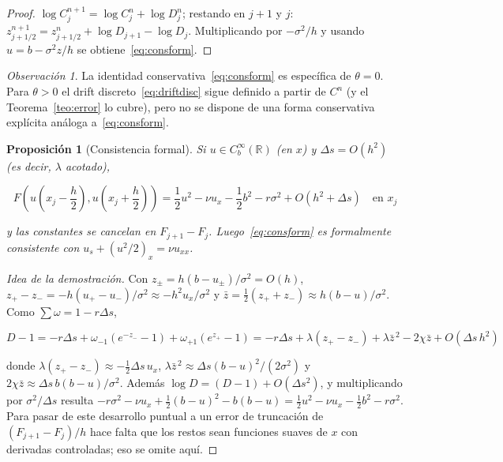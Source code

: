 \documentclass[11pt,letterpaper]{article}
\theoremstyle{plain}
\newtheorem{proposicion}[theorem]{Proposición}
\theoremstyle{definition}
\theoremstyle{remark}
\newtheorem{observacion}[theorem]{Observación}
\numberwithin{equation}{section}
\newcommand{\R}{\mathbb{R}}
\begin{document}
	\begin{proof}
		\(\log C^{n+1}_j=\log C^n_j+\log D^n_j\); restando en \(j+1\) y \(j\): \(z^{n+1}_{j+1/2}=z^n_{j+1/2}+\log D_{j+1}-\log D_j\). Multiplicando por \(-\sigma^2/h\) y usando \(u=b-\sigma^2z/h\) se obtiene~\eqref{eq:consform}.
	\end{proof}
	
	\begin{observacion}
		La identidad conservativa~\eqref{eq:consform} es específica de \(\theta=0\). Para \(\theta>0\) el drift discreto~\eqref{eq:driftdisc} sigue definido a partir de \(C^n\) (y el Teorema~\ref{teo:error} lo cubre), pero no se dispone de una forma conservativa explícita análoga a~\eqref{eq:consform}.
	\end{observacion}
	
	\begin{proposicion}[Consistencia formal]\label{prop:consist}
		Si \(u\in C_b^\infty(\R)\) (en \(x\)) y \(\Delta s=O(h^2)\) (es decir, \(\lambda\) acotado),
		
		\[
		F\left(u(x_j-\frac h2),u(x_j+\frac h2)\right)=\frac12u^2-\nu u_x-\frac12b^2-r\sigma^2+O(h^2+\Delta s)\quad\text{en }x_j
		\]
		
		y las constantes se cancelan en \(F_{j+1}-F_j\). Luego~\eqref{eq:consform} es formalmente consistente con \(u_s+(u^2/2)_x=\nu u_{xx}\).
	\end{proposicion}
	
	\begin{proof}[Idea de la demostración]
		Con \(z_\pm=h(b-u_\pm)/\sigma^2=O(h)\), \(z_+-z_-=-h(u_+-u_-)/\sigma^2\approx-h^2u_x/\sigma^2\) y \(\bar z=\frac12(z_++z_-)\approx h(b-u)/\sigma^2\). Como \(\sum\omega=1-r\Delta s\),
		
		\[
		D-1=-r\Delta s+\omega_{-1}(e^{-z_-}-1)+\omega_{+1}(e^{z_+}-1) =-r\Delta s+\lambda(z_+-z_-)+\lambda\bar z^{\,2}-2\chi\bar z+O(\Delta s\,h^2)
		\]
		
		donde \(\lambda(z_+-z_-)\approx-\frac12\Delta s\,u_x\), \(\lambda\bar z^{\,2}\approx\Delta s(b-u)^2/(2\sigma^2)\) y \(2\chi\bar z\approx\Delta s\,b(b-u)/\sigma^2\). Además \(\log D=(D-1)+O(\Delta s^2)\), y multiplicando por \(\sigma^2/\Delta s\) resulta \(-r\sigma^2-\nu u_x+\frac12(b-u)^2-b(b-u)=\frac12u^2-\nu u_x-\frac12b^2-r\sigma^2\). Para pasar de este desarrollo puntual a un error de truncación de \((F_{j+1}-F_j)/h\) hace falta que los restos sean funciones suaves de \(x\) con derivadas controladas; eso se omite aquí.
	\end{proof}
	
\end{document}
